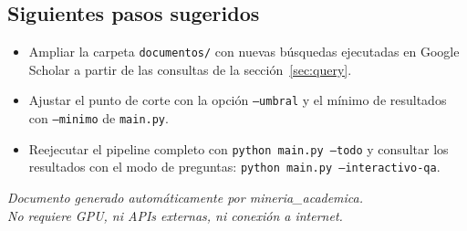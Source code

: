 \documentclass[11pt,a4paper]{article}
\begin{document}
\subsection*{Siguientes pasos sugeridos}

\begin{itemize}
\setlength{\itemsep}{3pt}
  \item Ampliar la carpeta \texttt{documentos/} con nuevas búsquedas
        ejecutadas en Google Scholar a partir de las consultas de la
        sección~\ref{sec:query}.
  \item Ajustar el punto de corte con la opción \texttt{--umbral} y el mínimo
        de resultados con \texttt{--minimo} de \texttt{main.py}.
  \item Reejecutar el pipeline completo con \texttt{python main.py --todo}
        y consultar los resultados con el modo de preguntas:
        \texttt{python main.py --interactivo-qa}.
\end{itemize}

\vfill
\begin{center}
\small
\textit{Documento generado automáticamente por mineria\_academica.\\
No requiere GPU, ni APIs externas, ni conexión a internet.}
\end{center}
\end{document}
